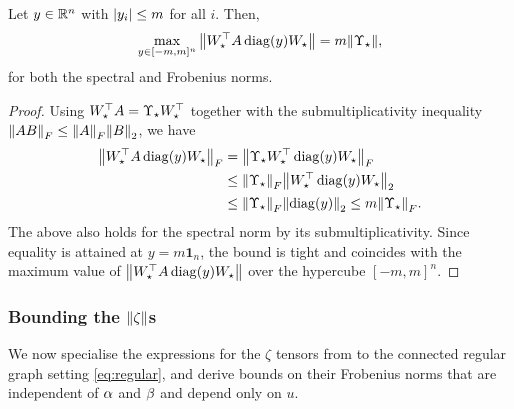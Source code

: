 \documentclass[a4paper]{cas-dc}
\begin{document}
\begin{lemma}
    \label{lem:WADW}
    Let \(y \in \R[n]\) with \(\abs{y_i} \le m\) for all \(i\). Then,
    \begin{equation*}
        \max_{y\in[-m,m]^n} \norm{W_{\star }^{\top} A \operatorname{diag}(y) W_{\star }} = m\norm{\Upsilon_{\star }},
    \end{equation*}
    for both the spectral and Frobenius norms.
\end{lemma}
\begin{proof}
    Using \(W_{\star }^{\top} A = \Upsilon_{\star } W_{\star }^{\top}\) together with the submultiplicativity inequality \(\norm{AB}_F \le \norm{A}_F\norm{B}_2\), we have
    \begin{align*}
        \norm{W_{\star }^{\top} A \operatorname{diag}(y) W_{\star }}_F & = \norm{\Upsilon_{\star } W_{\star }^{\top} \operatorname{diag}(y) W_{\star }}_F                 \\
                                         & \le \norm{\Upsilon_{\star }}_F \norm{W_{\star }^{\top} \operatorname{diag}(y) W_{\star }}_2      \\
                                         & \le \norm{\Upsilon_{\star }}_F \norm{\operatorname{diag}(y)}_2 \le m\norm{\Upsilon_{\star }}_F.
    \end{align*}
    The above also holds for the spectral norm by its submultiplicativity. Since equality is attained at \(y = m\mathbf{1}_n\), the bound is tight and coincides with the maximum value of \(\norm{W_{\star }^{\top} A \operatorname{diag}(y) W_{\star }}\) over the hypercube \([-m,m]^n\).
\end{proof}

\subsubsection*{Bounding the $\norm{\zeta}$s}

We now specialise the expressions for the \(\zeta\) tensors from  to the connected regular graph setting \eqref{eq:regular}, and derive bounds on their Frobenius norms that are independent of \(\alpha\) and \(\beta\) and depend only on \(u\).
\end{document}
